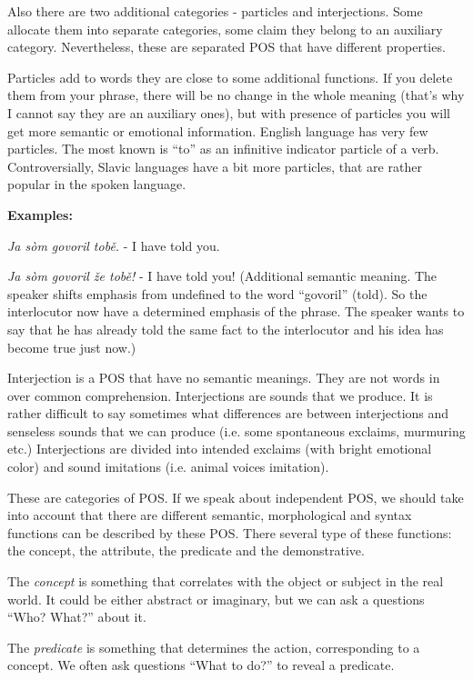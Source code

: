Also there are two additional categories - particles and interjections. Some allocate them into separate categories, some claim they belong to an auxiliary category. Nevertheless, these are separated POS that have different properties.

Particles add to words they are close to some additional functions. If you delete them from your phrase, there will be no change in the whole meaning (that’s why I cannot say they are an auxiliary ones), but with presence of particles you will get more semantic or emotional information. English language has very few particles. The most known is “to” as an infinitive indicator particle of a verb. Controversially, Slavic languages have a bit more particles, that are rather popular in the spoken language. 

\textbf{Examples:}

\textit{Ja sòm govoril tobě. }- I have told you.

\textit{Ja sòm govoril že tobě!} - I have told you! (Additional semantic meaning. The speaker shifts emphasis from undefined to the word “govoril” (told). So the interlocutor now have a determined emphasis of the phrase. The speaker wants to say that he has already told the same fact to the interlocutor and his idea has become true just now.) 

Interjection is a POS that have no semantic meanings. They are not words in over common comprehension. Interjections are sounds that we produce. It is rather difficult to say sometimes what differences are between interjections and senseless sounds that we can produce (i.e. some spontaneous exclaims, murmuring etc.) Interjections are divided into intended exclaims (with bright emotional color) and sound imitations (i.e. animal voices imitation).

These are categories of POS. If we speak about independent POS, we should take into account that there are different semantic, morphological and syntax functions can be described by these POS. There several type of these functions: the concept, the attribute, the predicate and the demonstrative.

The \textit{concept} is something that correlates with the object or subject in the real world. It could be either abstract or imaginary, but we can ask a questions “Who? What?” about it.

The \textit{predicate} is something that determines the action, corresponding to a concept. We often ask questions “What to do?” to reveal a predicate.

